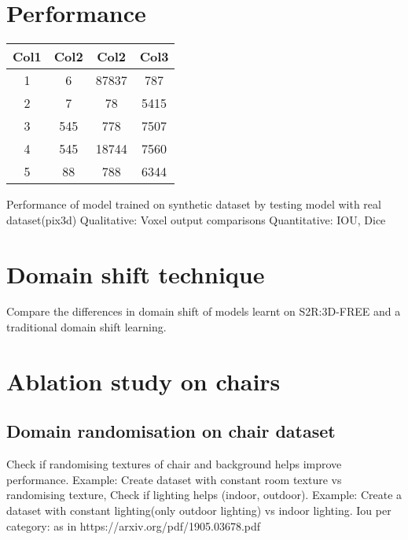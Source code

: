 \section{Performance}

\begin{center}
    \begin{tabular}{||c |c |c |c||}
        \hline
        Col1 & Col2 & Col2 & Col3 \\ [0.5ex]
        \hline\hline
        1 & 6 & 87837 & 787 \\
        \hline
        2 & 7 & 78 & 5415 \\
        \hline
        3 & 545 & 778 & 7507 \\
        \hline
        4 & 545 & 18744 & 7560 \\
        \hline
        5 & 88 & 788 & 6344 \\ [1ex]
        \hline
    \end{tabular}
\end{center}

Performance of model trained on synthetic dataset by testing model with real dataset(pix3d)
Qualitative: Voxel output comparisons
Quantitative: IOU, Dice

\section{Domain shift technique}

Compare the differences in domain shift of models learnt on S2R:3D-FREE and a traditional domain shift learning.

\section{Ablation study on chairs}

\subsection{Domain randomisation on chair dataset}

Check if randomising textures of chair and background helps improve performance.  Example: Create dataset with constant room texture vs randomising texture,
Check if lighting helps (indoor, outdoor). Example: Create a dataset with constant lighting(only outdoor lighting) vs indoor lighting.
Iou per category: as in https://arxiv.org/pdf/1905.03678.pdf
